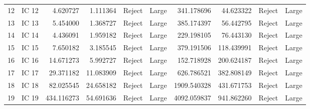 \begin{tabular}{llrrllrrll}
12 &  IC 12 &           4.620727 &            1.111364 &   Reject &       Large &               341.178696 &                 44.623322 &  Reject &       Large \\
13 &  IC 13 &           5.454000 &            1.368727 &   Reject &       Large &               385.174397 &                 56.442795 &  Reject &       Large \\
14 &  IC 14 &           4.436091 &            1.959182 &   Reject &       Large &               229.198105 &                 76.443130 &  Reject &       Large \\
15 &  IC 15 &           7.650182 &            3.185545 &   Reject &       Large &               379.191506 &                118.439991 &  Reject &       Large \\
16 &  IC 16 &          14.671273 &            5.992727 &   Reject &       Large &               152.718928 &                200.624187 &  Reject &       Large \\
17 &  IC 17 &          29.371182 &           11.083909 &   Reject &       Large &               626.786521 &                382.808149 &  Reject &       Large \\
18 &  IC 18 &          82.025545 &           24.658182 &   Reject &       Large &              1909.540328 &                431.671753 &  Reject &       Large \\
19 &  IC 19 &         434.116273 &           54.691636 &   Reject &       Large &              4092.059837 &                941.862260 &  Reject &       Large \\
\bottomrule
\end{tabular}
